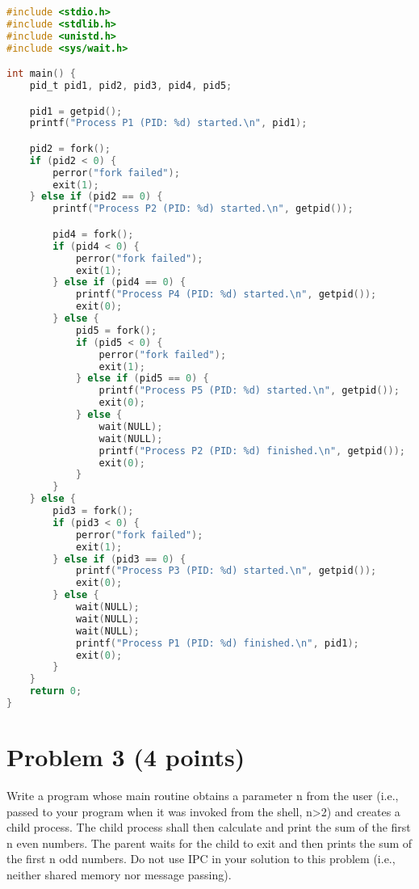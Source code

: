 \documentclass{article}
\begin{document}
\begin{lstlisting}[language=C, caption=Process Tree Creation]
#include <stdio.h>
#include <stdlib.h>
#include <unistd.h>
#include <sys/wait.h>

int main() {
    pid_t pid1, pid2, pid3, pid4, pid5;

    pid1 = getpid();
    printf("Process P1 (PID: %d) started.\n", pid1);

    pid2 = fork();
    if (pid2 < 0) {
        perror("fork failed");
        exit(1);
    } else if (pid2 == 0) {
        printf("Process P2 (PID: %d) started.\n", getpid());

        pid4 = fork();
        if (pid4 < 0) {
            perror("fork failed");
            exit(1);
        } else if (pid4 == 0) {
            printf("Process P4 (PID: %d) started.\n", getpid());
            exit(0);
        } else {
            pid5 = fork();
            if (pid5 < 0) {
                perror("fork failed");
                exit(1);
            } else if (pid5 == 0) {
                printf("Process P5 (PID: %d) started.\n", getpid());
                exit(0);
            } else {
                wait(NULL);
                wait(NULL);
                printf("Process P2 (PID: %d) finished.\n", getpid());
                exit(0);
            }
        }
    } else {
        pid3 = fork();
        if (pid3 < 0) {
            perror("fork failed");
            exit(1);
        } else if (pid3 == 0) {
            printf("Process P3 (PID: %d) started.\n", getpid());
            exit(0);
        } else {
            wait(NULL);
            wait(NULL);
            wait(NULL);
            printf("Process P1 (PID: %d) finished.\n", pid1);
            exit(0);
        }
    }
    return 0;
}
\end{lstlisting}


\section*{Problem 3 (4 points)}

Write a program whose main routine obtains a parameter n from the user (i.e., passed to your program when it was invoked from the shell, n>2) and creates a child process. The child process shall then calculate and print the sum of the first n even numbers. The parent waits for the child to exit and then prints the sum of the first n odd numbers. Do not use IPC in your solution to this problem (i.e., neither shared memory nor message passing).
\end{document}
